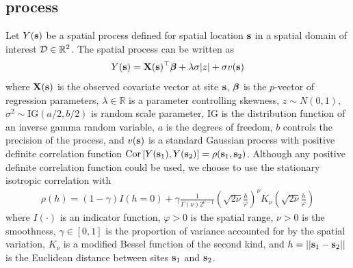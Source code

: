 \subsection{\Skewt{} process} \label{sts:skewt}

Let $Y(\mathbf{s})$ be a spatial process defined for spatial location $\mathbf{s}$ in a spatial domain of interest ${\cal D} \in \mathbb{R}^2$.
The spatial \skewt{} process can be written as
\begin{align}
  Y(\mathbf{s}) = \mathbf{X}(\mathbf{s})^\top \mbox{\boldmath $\beta$} + \lambda \sigma |z| + \sigma v(\mathbf{s}) \label{steq:fullmodel}
\end{align}
where $\mathbf{X}(\mathbf{s})$ is the observed covariate vector at site $\mathbf{s}$, $\mbox{\boldmath $\beta$}$ is the $p$-vector of regression parameters, $\lambda \in \mathbb{R}$ is a parameter controlling skewness, $z \sim N(0, 1)$, $\sigma^2 \sim \mathrm{IG}(a / 2, b / 2)$ is random scale parameter, IG is the distribution function of an inverse gamma random variable, $a$ is the degrees of freedom, $b$ controls the precision of the process, and $v(\mathbf{s})$ is a standard Gaussian process with positive definite correlation function $\text{Cor} \left[Y(\mathbf{s}_1), Y(\mathbf{s}_2)\right] = \rho(\mathbf{s}_1, \mathbf{s}_2)$.
Although any positive definite correlation function could be used, we choose to use the stationary isotropic \Matern correlation with
\begin{align}
  \rho(h) = (1 - \gamma) I(h = 0) + \gamma \frac{ 1 }{ \Gamma(\nu) 2^{ \nu - 1}} \left( \sqrt{2\nu} \frac{ h }{ \varphi } \right)^{\nu} K_{\nu} \left( \sqrt{2\nu} \frac{ h }{ \varphi } \right) \label{steq:matern}
\end{align}
where $I(\cdot)$ is an indicator function, $\varphi > 0$ is the spatial range, $\nu > 0$ is the smoothness, $\gamma \in [0, 1]$ is the proportion of variance accounted for by the spatial variation, $K_\nu$ is a modified Bessel function of the second kind, and $h = || \mathbf{s}_1 - \mathbf{s}_2 ||$ is the Euclidean distance between sites $\mathbf{s}_1$ and $\mathbf{s}_2$.

